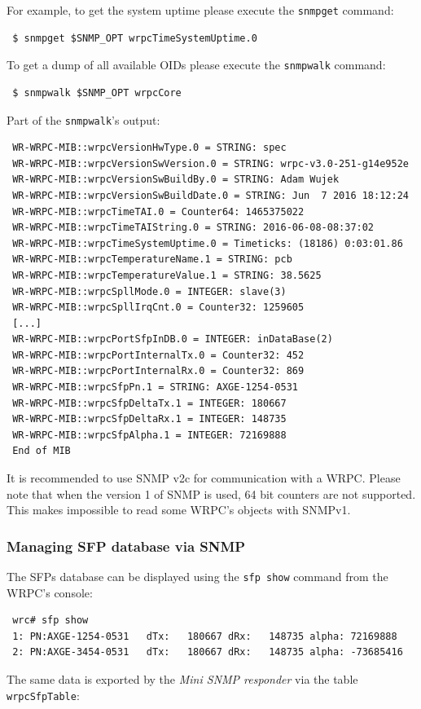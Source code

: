 \documentclass[a4paper, 12pt]{article}
\renewcommand{\_}{\underscore\allowbreak}
\begin{document}
For example, to get the system uptime please execute the \texttt{snmpget} command:
\begin{lstlisting}
 $ snmpget $SNMP_OPT wrpcTimeSystemUptime.0
\end{lstlisting}
To get a dump of all available OIDs please execute the \texttt{snmpwalk}
command:
\begin{lstlisting}
 $ snmpwalk $SNMP_OPT wrpcCore
\end{lstlisting}
Part of the \texttt{snmpwalk}'s output:
\begin{lstlisting}
 WR-WRPC-MIB::wrpcVersionHwType.0 = STRING: spec
 WR-WRPC-MIB::wrpcVersionSwVersion.0 = STRING: wrpc-v3.0-251-g14e952e
 WR-WRPC-MIB::wrpcVersionSwBuildBy.0 = STRING: Adam Wujek
 WR-WRPC-MIB::wrpcVersionSwBuildDate.0 = STRING: Jun  7 2016 18:12:24
 WR-WRPC-MIB::wrpcTimeTAI.0 = Counter64: 1465375022
 WR-WRPC-MIB::wrpcTimeTAIString.0 = STRING: 2016-06-08-08:37:02
 WR-WRPC-MIB::wrpcTimeSystemUptime.0 = Timeticks: (18186) 0:03:01.86
 WR-WRPC-MIB::wrpcTemperatureName.1 = STRING: pcb
 WR-WRPC-MIB::wrpcTemperatureValue.1 = STRING: 38.5625
 WR-WRPC-MIB::wrpcSpllMode.0 = INTEGER: slave(3)
 WR-WRPC-MIB::wrpcSpllIrqCnt.0 = Counter32: 1259605
 [...]
 WR-WRPC-MIB::wrpcPortSfpInDB.0 = INTEGER: inDataBase(2)
 WR-WRPC-MIB::wrpcPortInternalTx.0 = Counter32: 452
 WR-WRPC-MIB::wrpcPortInternalRx.0 = Counter32: 869
 WR-WRPC-MIB::wrpcSfpPn.1 = STRING: AXGE-1254-0531
 WR-WRPC-MIB::wrpcSfpDeltaTx.1 = INTEGER: 180667
 WR-WRPC-MIB::wrpcSfpDeltaRx.1 = INTEGER: 148735
 WR-WRPC-MIB::wrpcSfpAlpha.1 = INTEGER: 72169888
 End of MIB
\end{lstlisting}

It is recommended to use SNMP v2c for communication with a WRPC.
Please note that when the version 1 of SNMP is used, 64 bit counters are not
supported. This makes impossible to read some WRPC's objects with
SNMPv1.

\subsubsection{Managing SFP database via SNMP}
\label{Managing SFP database via SNMP}

The SFPs database can be displayed using the \texttt{sfp show} command from
the WRPC's console:
\begin{lstlisting}
 wrc# sfp show
 1: PN:AXGE-1254-0531   dTx:   180667 dRx:   148735 alpha: 72169888
 2: PN:AXGE-3454-0531   dTx:   180667 dRx:   148735 alpha: -73685416
\end{lstlisting}
The same data is exported by the \textit{Mini SNMP responder} via the table
\texttt{wrpcSfpTable}:
\end{document}
